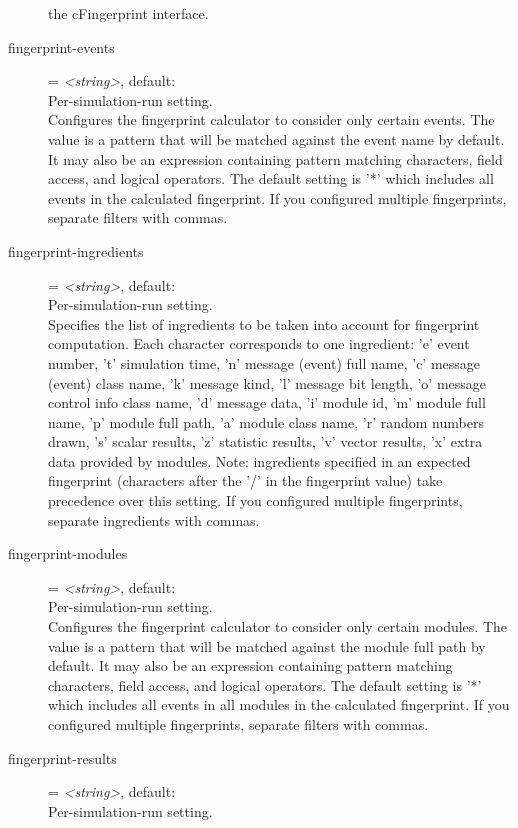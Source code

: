 \begin{description}
    the cFingerprint interface.
\item[fingerprint-events] = \textit{<string>}, default: \ttt{*}\\
    Per-simulation-run setting.\\
    Configures the fingerprint calculator to consider only certain events. The
    value is a pattern that will be matched against the event name by default.
    It may also be an expression containing pattern matching characters, field
    access, and logical operators. The default setting is '*' which includes
    all events in the calculated fingerprint. If you configured multiple
    fingerprints, separate filters with commas.
\item[fingerprint-ingredients] = \textit{<string>}, default: \\
    Per-simulation-run setting.\\
    Specifies the list of ingredients to be taken into account for fingerprint
    computation. Each character corresponds to one ingredient: 'e' event
    number, 't' simulation time, 'n' message (event) full name, 'c' message
    (event) class name, 'k' message kind, 'l' message bit length, 'o' message
    control info class name, 'd' message data, 'i' module id, 'm' module full
    name, 'p' module full path, 'a' module class name, 'r' random numbers
    drawn, 's' scalar results, 'z' statistic results, 'v' vector results, 'x'
    extra data provided by modules. Note: ingredients specified in an expected
    fingerprint (characters after the '/' in the fingerprint value) take
    precedence over this setting. If you configured multiple fingerprints,
    separate ingredients with commas.
\item[fingerprint-modules] = \textit{<string>}, default: \ttt{*}\\
    Per-simulation-run setting.\\
    Configures the fingerprint calculator to consider only certain modules. The
    value is a pattern that will be matched against the module full path by
    default. It may also be an expression containing pattern matching
    characters, field access, and logical operators. The default setting is '*'
    which includes all events in all modules in the calculated fingerprint. If
    you configured multiple fingerprints, separate filters with commas.
\item[fingerprint-results] = \textit{<string>}, default: \ttt{*}\\
    Per-simulation-run setting.\\

\end{description}

